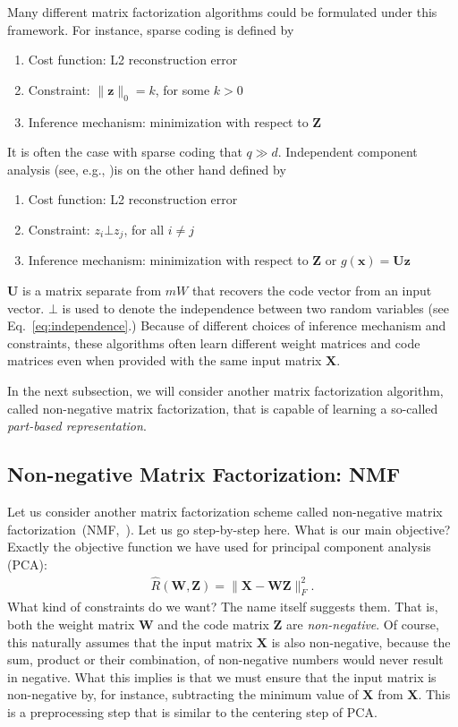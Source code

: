 \documentclass{report}
\newcommand{\vect}[1]{\mathbf{#1}}
\newcommand{\matr}[1]{\mathbf{#1}}
\newcommand{\vx}[0]{\vect{x}}
\newcommand{\vz}[0]{\vect{z}}
\newcommand{\mW}[0]{\matr{W}}
\newcommand{\mZ}[0]{\matr{Z}}
\newcommand{\mX}[0]{\matr{X}}
\newcommand{\mU}[0]{\matr{U}}
\begin{document}
Many different matrix factorization algorithms could be formulated under this
framework. For instance, sparse coding \cite{olshausen1997sparse} is defined by
\begin{enumerate}
    \item Cost function: L2 reconstruction error
    \item Constraint: $\| \vz \|_0=k$, for some $k>0$
    \item Inference mechanism: minimization with respect to $\mZ$
\end{enumerate}
It is often the case with sparse coding that $q\gg d$. Independent component
analysis (see, e.g., \cite{hyvarinen2004independent})is on the other hand
defined by
\begin{enumerate}
    \item Cost function: L2 reconstruction error
    \item Constraint: $z_i \bot z_j$, for all $i \neq j$
    \item Inference mechanism: minimization with respect to $\mZ$ or $g(\vx)=\mU
        \vz$
\end{enumerate}
$\mU$ is a matrix separate from $mW$ that recovers the code vector from an input
vector. $\bot$ is used to denote the independence between two random variables
(see Eq.~\eqref{eq:independence}.) Because of different choices of inference
mechanism and constraints, these algorithms often learn different weight
matrices and code matrices even when provided with the same input matrix $\mX$. 

In the next subsection, we will consider another matrix factorization algorithm,
called non-negative matrix factorization, that is capable of learning a
so-called {\it part-based representation}. 


\subsection{Non-negative Matrix Factorization: NMF}
\label{sec:nmf}

Let us consider another matrix factorization scheme called non-negative matrix
factorization~(NMF,~\cite{lee2001algorithms}). Let us go step-by-step here. What
is our main objective? Exactly the objective function we have used for principal
component analysis (PCA):
\begin{align*}
    \hat{R}(\mW, \mZ) = \| \mX - \mW \mZ \|_F^2.
\end{align*}
What kind of constraints do we want? The name itself suggests them. That is,
both the weight matrix $\mW$ and the code matrix $\mZ$ are {\it non-negative}.
Of course, this naturally assumes that the input matrix $\mX$ is also
non-negative, because the sum, product or their combination, of non-negative
numbers would never result in negative. What this implies is that we must ensure
that the input matrix is non-negative by, for instance, subtracting the minimum
value of $\mX$ from $\mX$. This is a preprocessing step that is similar to the
centering step of PCA.
\end{document}
